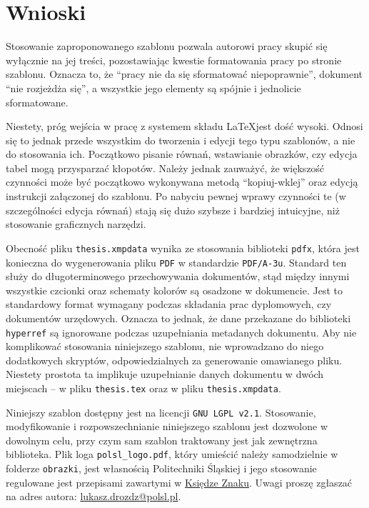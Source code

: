 \chapter{Wnioski}

Stosowanie zaproponowanego szablonu pozwala autorowi pracy skupić się wyłącznie na jej treści, pozostawiając kwestie formatowania pracy po stronie szablonu. Oznacza to, że \enquote{pracy nie da się sformatować niepoprawnie}, dokument \enquote{nie rozjeżdża się}, a wszystkie jego elementy są spójnie i jednolicie sformatowane.

Niestety, próg wejścia w pracę z systemem składu \LaTeX jest dość wysoki. Odnosi się to jednak przede wszystkim do tworzenia i edycji tego typu szablonów, a nie do stosowania ich. Początkowo pisanie równań, wstawianie obrazków, czy edycja tabel mogą przysparzać kłopotów. Należy jednak zauważyć, że większość czynności może być początkowo wykonywana metodą \enquote{kopiuj-wklej} oraz edycją instrukcji załączonej do szablonu. Po nabyciu pewnej wprawy czynności te (w szczególności edycja równań) stają się dużo szybsze i bardziej intuicyjne, niż stosowanie graficznych narzędzi.

Obecność pliku \verb|thesis.xmpdata| wynika ze stosowania biblioteki \verb|pdfx|, która jest konieczna do wygenerowania pliku \verb|PDF| w standardzie \verb|PDF/A-3u|. Standard ten służy do długoterminowego przechowywania dokumentów, stąd między innymi wszystkie czcionki oraz schematy kolorów są osadzone w dokumencie. Jest to standardowy format wymagany podczas składania prac dyplomowych, czy dokumentów urzędowych. Oznacza to jednak, że dane przekazane do biblioteki \verb|hyperref| są ignorowane podczas uzupełniania metadanych dokumentu. Aby nie komplikować stosowania niniejszego szablonu, nie wprowadzano do niego dodatkowych skryptów, odpowiedzialnych za generowanie omawianego pliku. Niestety prostota ta implikuje uzupełnianie danych dokumentu w dwóch miejscach -- w pliku \verb|thesis.tex| oraz w pliku \verb|thesis.xmpdata|.

Niniejszy szablon dostępny jest na licencji \verb|GNU LGPL v2.1|. Stosowanie, modyfikowanie i rozpowszechnianie niniejszego szablonu jest dozwolone w dowolnym celu, przy czym sam szablon traktowany jest jak zewnętrzna biblioteka. Plik loga \verb|polsl_logo.pdf|, który umieścić należy samodzielnie w folderze \verb|obrazki|, jest własnością Politechniki Śląskiej i jego stosowanie regulowane jest przepisami zawartymi w \href{https://www.polsl.pl/siwps/logo-2/}{Księdze Znaku}. Uwagi proszę zgłaszać na adres autora: \href{mailto:lukasz.drozdz@polsl.pl}{lukasz.drozdz@polsl.pl}.
